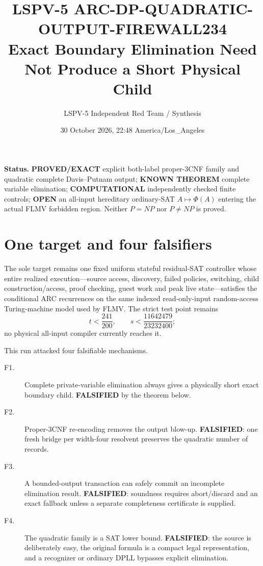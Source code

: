 \documentclass[11pt]{article}
\title{LSPV-5 ARC-DP-QUADRATIC-OUTPUT-FIREWALL234\\
Exact Boundary Elimination Need Not Produce a Short Physical Child}
\author{LSPV-5 Independent Red Team / Synthesis}
\date{30 October 2026, 22:48 America/Los\_Angeles}
\begin{document}
\maketitle

\noindent\textbf{Status.}
\textbf{PROVED/EXACT} explicit both-label proper-3CNF family and quadratic
complete Davis--Putnam output; \textbf{KNOWN THEOREM} complete
variable elimination; \textbf{COMPUTATIONAL} independently checked finite
controls; \textbf{OPEN} an all-input hereditary ordinary-SAT
$A\mapsto\Phi(A)$ entering the actual FLMV forbidden region.  Neither
$P=NP$ nor $P\ne NP$ is proved.

\section{One target and four falsifiers}
The sole target remains one fixed uniform stateful residual-SAT controller
whose entire realized execution---source access, discovery, failed policies,
switching, child construction/access, proof checking, guest work and peak live
state---satisfies the conditional ARC recurrences on the same indexed
read-only-input random-access Turing-machine model used by FLMV.  The strict
test point remains
\[
 t<\frac{241}{200},\qquad
 s<\frac{11642479}{23232400};
\]
no physical all-input compiler currently reaches it.

This run attacked four falsifiable mechanisms.
\begin{description}
\item[F1.] Complete private-variable elimination always gives a physically
short exact boundary child.  \textbf{FALSIFIED} by the theorem below.
\item[F2.] Proper-3CNF re-encoding removes the output blow-up.
\textbf{FALSIFIED}: one fresh bridge per width-four resolvent preserves the
quadratic number of records.
\item[F3.] A bounded-output transaction can safely commit an incomplete
elimination result.  \textbf{FALSIFIED}: soundness requires abort/discard and
an exact fallback unless a separate completeness certificate is supplied.
\item[F4.] The quadratic family is a SAT lower bound.  \textbf{FALSIFIED}:
the source is deliberately easy, the original formula is a compact legal
representation, and a recognizer or ordinary DPLL bypasses explicit
elimination.
\end{description}
\end{document}
